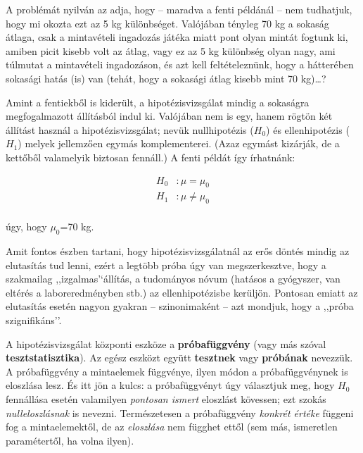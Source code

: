 \documentclass[]{book}
\begin{document}
A problémát nyilván az adja, hogy -- maradva a fenti példánál -- nem
tudhatjuk, hogy mi okozta ezt az 5 kg különbséget. Valójában tényleg 70
kg a sokaság átlaga, csak a mintavételi ingadozás játéka miatt pont
olyan mintát fogtunk ki, amiben picit kisebb volt az átlag, vagy ez az 5
kg különbség olyan nagy, ami túlmutat a mintavételi ingadozáson, és azt
kell feltételeznünk, hogy a hátterében sokasági hatás (is) van (tehát,
hogy a sokasági átlag kisebb mint 70 kg)\dots{}?

Amint a fentiekből is kiderült, a hipotézisvizsgálat mindig a sokaságra
megfogalmazott állításból indul ki. Valójában nem is egy, hanem rögtön
két állítást használ a hipotézisvizsgálat; nevük nullhipotézis (\(H_0\))
és ellenhipotézis (\(H_1\)) melyek jellemzően egymás komplementerei.
(Azaz egymást kizárják, de a kettőből valamelyik biztosan fennáll.) A
fenti példát így írhatnánk:

\begin{align*}
    H_0&: \mu = \mu_0\\
    H_1&: \mu \neq \mu_0\\
\end{align*}

úgy, hogy \(\mu_0\)=70 kg.

Amit fontos észben tartani, hogy hipotézisvizsgálatnál az erős döntés
mindig az elutasítás tud lenni, ezért a legtöbb próba úgy van
megszerkesztve, hogy a szakmailag ,,izgalmas'`állítás, a tudományos
nóvum (hatásos a gyógyszer, van eltérés a laboreredményben stb.) az
ellenhipotézisbe kerüljön. Pontosan emiatt az elutasítás esetén nagyon
gyakran -- szinonimaként -- azt mondjuk, hogy a ,,próba szignifikáns''.

A hipotézisvizsgálat központi eszköze a \textbf{próbafüggvény} (vagy más
szóval \textbf{tesztstatisztika}). Az egész eszközt együtt
\textbf{tesztnek} vagy \textbf{próbának} nevezzük. A próbafüggvény a
mintaelemek függvénye, ilyen módon a próbafüggvénynek is eloszlása lesz.
És itt jön a kulcs: a próbafüggvényt úgy választjuk meg, hogy \(H_0\)
fennállása esetén valamilyen \emph{pontosan ismert} eloszlást kövessen;
ezt szokás \emph{nulleloszlásnak} is nevezni. Természetesen a
próbafüggvény \emph{konkrét értéke} függeni fog a mintaelemektől, de az
\emph{eloszlása} nem függhet ettől (sem más, ismeretlen paramétertől, ha
volna ilyen).
\end{document}
